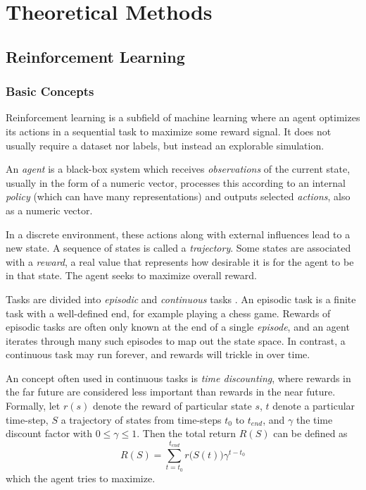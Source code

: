 \chapter{Theoretical Methods}

\section{Reinforcement Learning}
\label{ReinforcementLearningChapter}
\subsection{Basic Concepts}
Reinforcement learning is a subfield of machine learning where an agent optimizes its actions in a sequential task to maximize some reward signal. It does not usually require a dataset nor labels, but instead an explorable simulation.

An \textit{agent} is a black-box system which receives \textit{observations} of the current state, usually in the form of a numeric vector, processes this according to an internal \textit{policy} (which can have many representations) and outputs selected \textit{actions}, also as a numeric vector.

In a discrete environment, these actions along with external influences lead to a new state. A sequence of states is called a \textit{trajectory}. Some states are associated with a \textit{reward}, a real value that represents how desirable it is for the agent to be in that state. The agent seeks to maximize overall reward.

Tasks are divided into \textit{episodic} and \textit{continuous} tasks \cite[Chapters 3.3 \& 3.4]{Sutton}. An episodic task is a finite task with a well-defined end, for example playing a chess game. Rewards of episodic tasks are often only known at the end of a single \textit{episode}, and an agent iterates through many such episodes to map out the state space. In contrast, a continuous task may run forever, and rewards will trickle in over time. 

An concept often used in continuous tasks is \textit{time discounting}, where rewards in the far future are considered less important than rewards in the near future. Formally, let $r(s)$ denote the reward of particular state $s$, $t$ denote a particular time-step, $S$ a trajectory of states from time-steps $t_0$ to $t_{end}$, and $\gamma$ the time discount factor with $0 \leq \gamma \leq 1$. Then the total return $R(S)$ can be defined as
\begin{equation}
    R(S) = \sum_{t=t_0}^{t_{end}}{r\big(S(t)\big)\gamma^{t-t_0}}
\end{equation}
which the agent tries to maximize.

